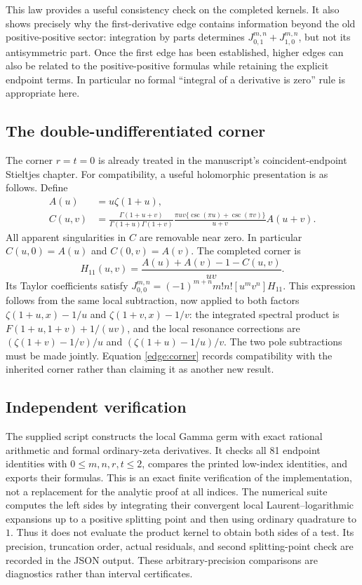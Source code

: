 \documentclass[11pt,letterpaper]{article}
\numberwithin{equation}{section}
\theoremstyle{definition}
\theoremstyle{remark}
\begin{document}
This law provides a useful consistency check on the completed kernels.
It also shows precisely why the first-derivative edge contains information
beyond the old positive-positive sector: integration by parts determines
$J_{0,1}^{m,n}+J_{1,0}^{m,n}$, but not its antisymmetric part.  Once
the first edge has been established, higher edges can also be related
to the positive-positive formulas while retaining the explicit endpoint
terms.  In particular no formal ``integral of a derivative is zero''
rule is appropriate here.

\subsection{The double-undifferentiated corner}

The corner $r=t=0$ is already treated in the manuscript's
coincident-endpoint Stieltjes chapter.  For compatibility, a useful
holomorphic presentation is as follows.  Define
\begin{align}
 A(u)&=u\zeta(1+u),\\
 C(u,v)&=\frac{\Gamma(1+u+v)}{\Gamma(1+u)\Gamma(1+v)}
   \frac{\pi uv\{\csc(\pi u)+\csc(\pi v)\}}{u+v}
                                    A(u+v).
\end{align}
All apparent singularities in $C$ are removable near zero.  In
particular $C(u,0)=A(u)$ and $C(0,v)=A(v)$.
The completed corner is
\begin{equation}
 H_{11}(u,v)=\frac{A(u)+A(v)-1-C(u,v)}{uv}.
 \label{edge:corner}
\end{equation}
Its Taylor coefficients satisfy
$J_{0,0}^{m,n}=(-1)^{m+n}m!n![u^mv^n]H_{11}$.
This expression follows from the same local subtraction, now applied
to both factors $\zeta(1+u,x)-1/u$ and
$\zeta(1+v,x)-1/v$: the integrated spectral product is
$F(1+u,1+v)+1/(uv)$, and the local resonance corrections are
$(\zeta(1+v)-1/v)/u$ and $(\zeta(1+u)-1/u)/v$.
The two pole subtractions must be made jointly.
Equation \eqref{edge:corner} records compatibility with the inherited
corner rather than claiming it as another new result.


\subsection{Independent verification}

The supplied script constructs the local Gamma germ with exact
rational arithmetic and formal ordinary-zeta derivatives.  It checks
all 81 endpoint identities with $0\le m,n,r,t\le2$, compares the
printed low-index identities, and exports their formulas.  This is
an exact finite verification of the implementation, not a replacement
for the analytic proof at all indices.
The numerical suite computes the left sides by integrating their
convergent local Laurent--logarithmic expansions up to a positive
splitting point and then using ordinary quadrature to $1$.
Thus it does not evaluate the product kernel to obtain both sides
of a test.  Its precision, truncation order, actual residuals, and
second splitting-point check are recorded in the JSON output.
These arbitrary-precision comparisons are diagnostics rather than
interval certificates.
\end{document}
